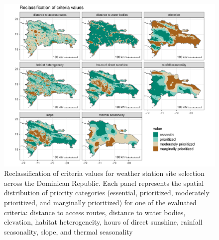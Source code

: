 \documentclass[spanish]{article}
\begin{document}
\begin{figure}[!ht]

{\centering \includegraphics[width=1\linewidth]{figuras/all_criteria_mapa_eng_p} 

}

\caption{Reclassification of criteria values for weather station site selection across the Dominican Republic. Each panel represents the spatial distribution of priority categories (essential, prioritized, moderately prioritized, and marginally prioritized) for one of the evaluated criteria: distance to access routes, distance to water bodies, elevation, habitat heterogeneity, hours of direct sunshine, rainfall seasonality, slope, and thermal seasonality}\label{fig:all_criteria_mapa_eng_p}
\end{figure}
\end{document}
